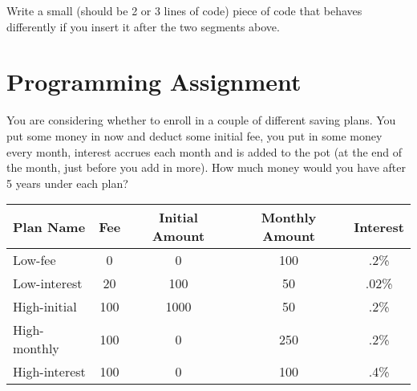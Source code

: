 Write a small (should be 2 or 3 lines of code) piece of code that behaves differently if you insert it after the two segments above.

\chapter{Programming Assignment}

You are considering whether to enroll in a couple of different saving plans. You put some money in now and deduct some initial fee, you put in some money every month, interest accrues each month and is added to the pot (at the end of the month, just before you add in more). How much money would you have after 5 years under each plan?

\begin{tabular}{lcccc}
\toprule
Plan Name & Fee & Initial Amount & Monthly Amount & Interest \\
\midrule
Low-fee & 0 & 0 & 100 & .2\% \\
Low-interest & 20 & 100 & 50 & .02\% \\
High-initial & 100 & 1000 & 50 & .2\% \\
High-monthly & 100 & 0 & 250 & .2\% \\
High-interest & 100 & 0 & 100 & .4\% \\
\bottomrule
\end{tabular}



